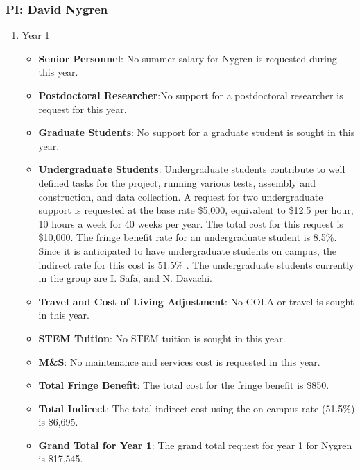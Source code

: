 \newpage

\subsubsection{\bf PI: David Nygren}
\begin{enumerate}
\item{Year 1}
\begin{itemize}[noitemsep,nolistsep]
\item{{\bf Senior Personnel}: No summer salary for Nygren is requested during this year.}

\item {{\bf Postdoctoral Researcher}:No support for a postdoctoral researcher is request for this year.} 

\item{{\bf Graduate Students}: No support for a graduate student is sought in this year.}

\item {{\bf Undergraduate Students}: Undergraduate students contribute to well defined tasks for the project, running various tests, assembly and construction, and data collection.  A request for two undergraduate support is requested at the base rate \$5,000, equivalent to \$12.5 per hour, 10 hours a week for 40 weeks per year.  The total cost for this request is \$10,000.  The fringe benefit rate for an undergraduate student is 8.5\%.  Since it is anticipated to have undergraduate students on campus, the indirect rate for this cost is 51.5\% .  The undergraduate students currently in the group are I. Safa, and N. Davachi.}

\item{{\bf Travel and Cost of Living Adjustment}: No COLA or travel is sought in this year.}

\item {{\bf STEM Tuition}: No STEM tuition is sought in this year.}

\item {{\bf M\&S}: No maintenance and services cost is requested in this year.}

\item {{\bf Total Fringe Benefit}: The total cost for the fringe benefit is \$850.}

\item {{\bf Total Indirect}: The total indirect cost using the on-campus rate (51.5\%) is \$6,695.}

\item {{\bf Grand Total for Year 1}: The grand total request for year 1 for Nygren is \$17,545.}


\end{itemize}
\end{enumerate}
